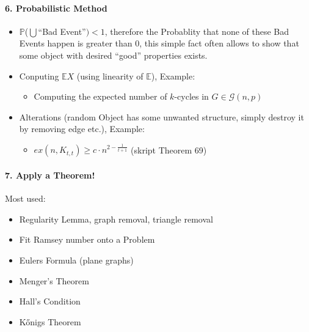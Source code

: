 \documentclass[a4paper]{article}
\begin{document}
\paragraph{6. Probabilistic Method}
\begin{itemize}
    \item $\mathbb{P}$($\bigcup$\enquote{Bad Event}$) < 1$, therefore the Probablity 
    that none of these Bad Events happen is greater than 0, this simple fact often
    allows to show that some object with desired \enquote{good} properties exists.

    \item Conputing $ \mathbb{E} X$ (using linearity of $\mathbb{E}$), Example: 
        \begin{itemize}
            \item Computing the expected number of $k$-cycles in 
            $ G \in \mathcal{G}(n,p)$ 
        \end{itemize}

    \item Alterations (random Object has some unwanted structure, simply destroy it 
    by removing edge etc.), Example:
        \begin{itemize}
            \item $ ex(n,K_{t,t}) \geq c\cdot n^{2 - \frac{1}{t+1}} $ (skript Theorem 69)
        \end{itemize}

\end{itemize}

\paragraph{7. Apply a Theorem!}  $ $ \\ 
Most used:
    \begin{itemize}
        \item Regularity Lemma, graph removal, triangle removal
        \item Fit Ramsey number onto a Problem
        \item Eulers Formula (plane graphs)
        \item Menger's Theorem 
        \item Hall's Condition 
        \item K\H{o}nigs Theorem
    \end{itemize}
\end{document}

